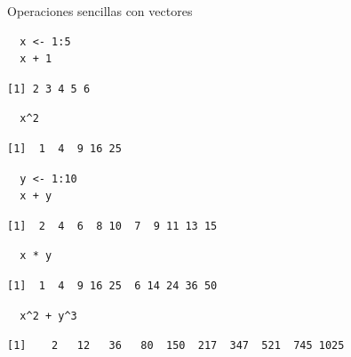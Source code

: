 \documentclass[xcolor={usenames,svgnames,dvipsnames}]{beamer}
\begin{document}
\begin{frame}[fragile,label={sec:orgheadline23}]{Operaciones sencillas con vectores}
 \lstset{language=R,label= ,caption= ,captionpos=b,numbers=none}
\begin{lstlisting}
  x <- 1:5
  x + 1
\end{lstlisting}

\begin{verbatim}
[1] 2 3 4 5 6
\end{verbatim}

\lstset{language=R,label= ,caption= ,captionpos=b,numbers=none}
\begin{lstlisting}
  x^2
\end{lstlisting}

\begin{verbatim}
[1]  1  4  9 16 25
\end{verbatim}

\lstset{language=R,label= ,caption= ,captionpos=b,numbers=none}
\begin{lstlisting}
  y <- 1:10
  x + y
\end{lstlisting}

\begin{verbatim}
[1]  2  4  6  8 10  7  9 11 13 15
\end{verbatim}

\lstset{language=R,label= ,caption= ,captionpos=b,numbers=none}
\begin{lstlisting}
  x * y
\end{lstlisting}

\begin{verbatim}
[1]  1  4  9 16 25  6 14 24 36 50
\end{verbatim}

\lstset{language=R,label= ,caption= ,captionpos=b,numbers=none}
\begin{lstlisting}
  x^2 + y^3
\end{lstlisting}

\begin{verbatim}
[1]    2   12   36   80  150  217  347  521  745 1025
\end{verbatim}
\end{frame}
\end{document}
